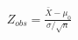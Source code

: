 \documentclass[preview]{standalone}
\begin{document}
\begin{align*}
Z_{obs} = \frac{\bar{X} - \mu_0}{\sigma / \sqrt{n}}
\end{align*}
\end{document}

